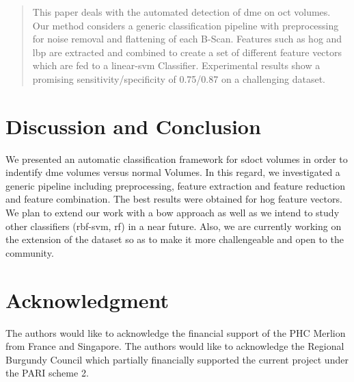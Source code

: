 \documentclass[10pt,conference]{latex/ieeeconf}
\begin{document}

\maketitle

\begin{abstract}
This paper deals with the automated detection of \gls{dme} on \gls{oct} volumes.
Our method considers a generic classification pipeline with preprocessing for noise removal and flattening of each B-Scan.
Features such as \gls{hog} and \gls{lbp} are extracted and combined to create a set of different feature vectors which are fed to a linear-\gls{svm} Classifier.
Experimental results show a promising sensitivity/specificity of 0.75/0.87 on a challenging dataset.
\end{abstract}



\glsresetall %





\section{Discussion and Conclusion}\label{sec:dis-con}

We presented an automatic classification framework for \gls{sdoct} volumes in order to indentify \gls{dme} volumes versus normal Volumes.
In this regard, we investigated a generic pipeline including preprocessing, feature extraction and feature reduction and feature combination.
The best results were obtained for \gls{hog} feature vectors.
We plan to extend our work with a \gls{bow} approach as well as we intend to study other classifiers (\gls{rbf}-\gls{svm}, \gls{rf}) in a near future.
Also, we are currently working on the extension of the dataset so as to make it more challengeable and open to the community.

\section{Acknowledgment}
The authors would like to acknowledge the financial support of the PHC Merlion from France and Singapore.
The authors would like to acknowledge the Regional Burgundy Council which partially financially supported the current project under the PARI scheme 2.
\end{document}
